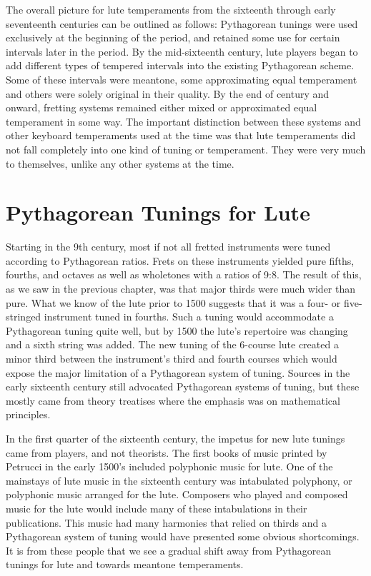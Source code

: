 The overall picture for lute temperaments from the sixteenth through early seventeenth
centuries can be outlined as follows: Pythagorean tunings were used exclusively at the
beginning of the period, and retained some use for certain intervals later in the period.
By the mid-sixteenth century, lute players began to add different types of tempered
intervals into the existing Pythagorean scheme.  Some of these intervals were meantone,
some approximating equal temperament and others were solely original in their quality.  By
the end of century and onward, fretting systems remained either mixed or approximated
equal temperament in some way. The important distinction between these systems and other
keyboard temperaments used at the time was that lute temperaments did not fall completely
into one kind of tuning or temperament. They were very much to themselves, unlike any
other systems at the time.

\section{Pythagorean Tunings for Lute}

Starting in the 9th century, most if not all fretted
instruments were tuned according to Pythagorean ratios.  Frets on these instruments
yielded pure fifths, fourths, and octaves as well as wholetones with a ratios of 9:8. \autocite[9]{ML:1}
The result of this, as we saw in the previous chapter, was that major thirds were
much wider than pure.  What we know of the lute prior to 1500 suggests that it was a four-
or five-stringed instrument tuned in fourths.  Such a tuning would accommodate a
Pythagorean tuning quite well, but by 1500 the lute's repertoire was changing and a sixth
string was added.  The new tuning of the 6-course lute created a minor third between the instrument's
third and fourth courses which would expose the major limitation of a Pythagorean system of tuning.
Sources in the early sixteenth century still advocated Pythagorean
systems of tuning, but these mostly came from theory treatises where the emphasis was
on mathematical principles.

In the first quarter of the sixteenth century, the impetus for new lute tunings came from
players, and not theorists.  The first books of music printed by Petrucci in the early
1500's included polyphonic music for lute.  One of the mainstays of lute music in the sixteenth century
was intabulated polyphony, or polyphonic music arranged for the lute.  Composers who played and
composed music for the lute would include many of these intabulations in their publications.
This music had many harmonies that relied on thirds and a Pythagorean system of tuning would
have presented some obvious shortcomings.  It is from these people that we see a gradual shift
away from Pythagorean tunings for lute and towards meantone temperaments.

